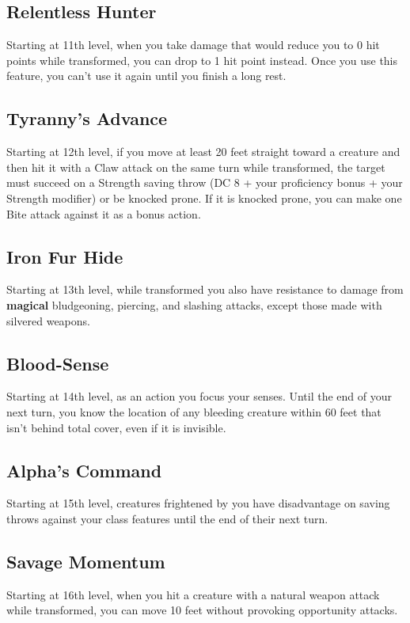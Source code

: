 \documentclass{apotheosis-book}
\begin{document}
\subsection*{Relentless Hunter}
Starting at 11th level, when you take damage that would reduce you to 0 hit points while transformed, you can drop to 1 hit point instead. Once you use this feature, you can't use it again until you finish a long rest.

\subsection*{Tyranny's Advance}
Starting at 12th level, if you move at least 20 feet straight toward a creature and then hit it with a Claw attack on the same turn while transformed, the target must succeed on a Strength saving throw (DC 8 + your proficiency bonus + your Strength modifier) or be knocked prone. If it is knocked prone, you can make one Bite attack against it as a bonus action.

\subsection*{Iron Fur Hide}
Starting at 13th level, while transformed you also have resistance to damage from \textbf{magical} bludgeoning, piercing, and slashing attacks, except those made with silvered weapons.

\subsection*{Blood-Sense}
Starting at 14th level, as an action you focus your senses. Until the end of your next turn, you know the location of any bleeding creature within 60 feet that isn't behind total cover, even if it is invisible.

\subsection*{Alpha's Command}
Starting at 15th level, creatures frightened by you have disadvantage on saving throws against your class features until the end of their next turn.

\subsection*{Savage Momentum}
Starting at 16th level, when you hit a creature with a natural weapon attack while transformed, you can move 10 feet without provoking opportunity attacks.
\end{document}
